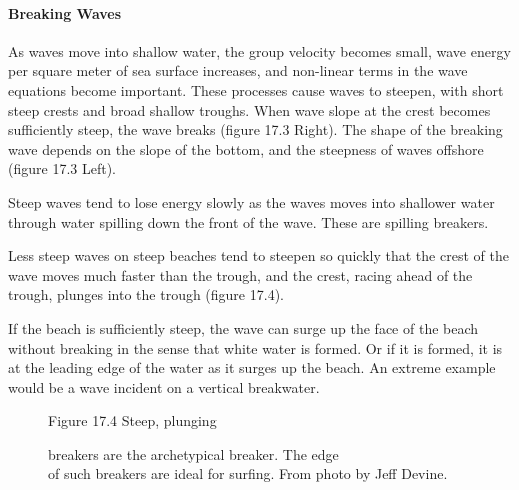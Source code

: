\paragraph{Breaking Waves}
As waves move into shallow water, the group
velocity becomes small, wave energy per square meter of sea surface
increases, and non-linear terms in the wave equations become
important. These processes cause waves to steepen, with short steep
crests and broad shallow troughs. When wave slope at the crest becomes
sufficiently steep, the wave breaks (figure 17.3 Right). The shape of
the breaking wave depends on the slope of the bottom, and the
steepness of waves offshore (figure 17.3 Left).
\begin{enumerate}
\vitem Steep waves tend to lose energy slowly as the waves moves into
shallower water through water spilling down the front of the
wave. These are spilling breakers.

\vitem Less steep waves on steep beaches tend to steepen so quickly
that the crest of the wave moves much faster than the trough, and the
crest, racing ahead of the trough, plunges
into the trough (figure 17.4).

\vitem If the beach is sufficiently steep, the wave can
surge up the face of the beach without
breaking in the sense that white water is formed. Or if it is formed,
it is at the leading edge of the water as it surges up the beach. An
extreme example would be a wave incident on a vertical breakwater.
\end{enumerate}

\begin{figure}[t!]
\centering
\footnotesize
Figure 17.4 Steep, plunging
\rule{0pt}{4ex}breakers are the archetypical
breaker. The edge\\of such breakers are ideal for surfing. From photo
by Jeff Devine.

\label{fig:wavecropped}
\vspace{-3ex}
\end{figure}

